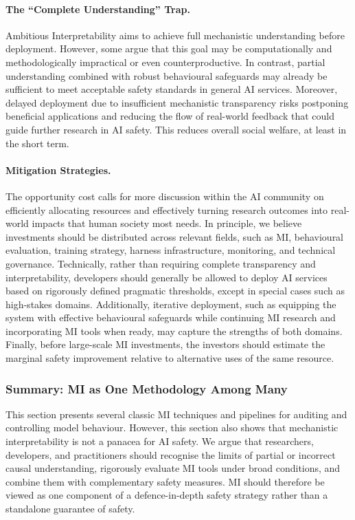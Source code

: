 \paragraph{The ``Complete Understanding'' Trap.}
Ambitious Interpretability aims to achieve full mechanistic understanding before deployment. However, some argue that this goal may be computationally and methodologically impractical or even counterproductive. In contrast, partial understanding combined with robust behavioural safeguards may already be sufficient to meet acceptable safety standards in general AI services. Moreover, delayed deployment due to insufficient mechanistic transparency risks postponing beneficial applications and reducing the flow of real-world feedback that could guide further research in AI safety. This reduces overall social welfare, at least in the short term.


\paragraph{Mitigation Strategies.}
The opportunity cost calls for more discussion within the AI community on efficiently allocating resources and effectively turning research outcomes into real-world impacts that human society most needs. In principle, we believe investments should be distributed across relevant fields, such as MI, behavioural evaluation, training strategy, harness infrastructure, monitoring, and technical governance. Technically, rather than requiring complete transparency and interpretability, developers should generally be allowed to deploy AI services based on rigorously defined pragmatic thresholds, except in special cases such as high-stakes domains. Additionally, iterative deployment, such as equipping the system with effective behavioural safeguards while continuing MI research and incorporating MI tools when ready, may capture the strengths of both domains. Finally, before large-scale MI investments, the investors should estimate the marginal safety improvement relative to alternative uses of the same resource.










\subsubsection{Summary: MI as One Methodology Among Many}

This section presents several classic MI techniques and pipelines for auditing and controlling model behaviour. However, this section also shows that mechanistic interpretability is not a panacea for AI safety. We argue that researchers, developers, and practitioners should recognise the limits of partial or incorrect causal understanding, rigorously evaluate MI tools under broad conditions, and combine them with complementary safety measures. MI should therefore be viewed as one component of a defence-in-depth safety strategy rather than a standalone guarantee of safety.



